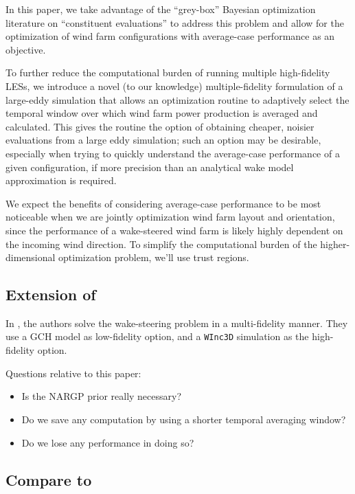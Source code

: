 \documentclass[12pt]{article}
\begin{document}
In this paper, we take advantage of the ``grey-box'' Bayesian optimization literature on
``constituent evaluations'' to address this problem and allow for the optimization of
wind farm configurations with average-case performance as an objective.

To further reduce the computational burden of running multiple high-fidelity LESs,
we introduce a novel (to our knowledge) multiple-fidelity formulation of a large-eddy simulation
that allows an optimization routine to adaptively select the temporal window over which
wind farm power production is averaged and calculated. This gives the routine the option of obtaining
cheaper, noisier evaluations from a large eddy simulation; such an option may be desirable,
especially when trying to quickly understand the average-case performance of a given configuration,
if more precision than an analytical wake model approximation is required.

We expect the benefits of considering average-case performance to be most
noticeable when we are jointly optimization wind farm layout and orientation,
since the performance of a wake-steered wind farm is likely highly dependent on
the incoming wind direction. To simplify the computational burden of the
higher-dimensional optimization problem, we'll use trust regions.

\subsection{Extension of \cite{moleMultiFidelityBayesianOptimisation2024}}
In \cite{moleMultiFidelityBayesianOptimisation2024}, the authors solve the
wake-steering problem in a multi-fidelity manner. They use a GCH model as
low-fidelity option, and a \texttt{WInc3D} simulation as the high-fidelity option.

Questions relative to this paper:
\begin{itemize}
    \item Is the NARGP prior really necessary?
    \item Do we save any computation by using a shorter temporal averaging window?
    \item Do we lose any performance in doing so?
\end{itemize}

\subsection{Compare to \cite{bempedelisDatadrivenOptimisationWind2024}}
\end{document}
